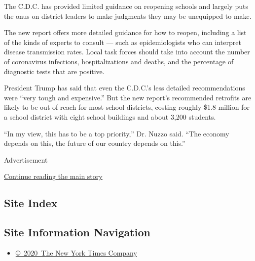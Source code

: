 The C.D.C. has provided limited guidance on reopening schools and
largely puts the onus on district leaders to make judgments they may be
unequipped to make.

The new report offers more detailed guidance for how to reopen,
including a list of the kinds of experts to consult --- such as
epidemiologists who can interpret disease transmission rates. Local task
forces should take into account the number of coronavirus infections,
hospitalizations and deaths, and the percentage of diagnostic tests that
are positive.

President Trump has said that even the C.D.C.'s less detailed
recommendations were ``very tough and expensive.'' But the new report's
recommended retrofits are likely to be out of reach for most school
districts, costing roughly \$1.8 million for a school district with
eight school buildings and about 3,200 students.

``In my view, this has to be a top priority,'' Dr. Nuzzo said. ``The
economy depends on this, the future of our country depends on this.''

Advertisement

\protect\hyperlink{after-bottom}{Continue reading the main story}

\hypertarget{site-index}{%
\subsection{Site Index}\label{site-index}}

\hypertarget{site-information-navigation}{%
\subsection{Site Information
Navigation}\label{site-information-navigation}}

\begin{itemize}
\tightlist
\item
  \href{https://help.nytimes3xbfgragh.onion/hc/en-us/articles/115014792127-Copyright-notice}{©~2020~The
  New York Times Company}
\end{itemize}

